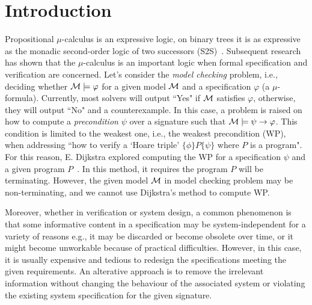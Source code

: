 \documentclass[runningheads]{llncs}
\begin{document}
\section{Introduction}
Propositional $\mu$-calculus is an expressive logic, on binary trees it is as expressive as the monadic second-order logic of two successors (S2S)~\cite{emerson1991tree,niwinski1988fixed}.
Subsequent research has shown that the $\mu$-calculus is an important logic when formal specification and verification are concerned.
Let's consider the \emph{model checking} problem, i.e., deciding whether ${\cal M} \models \varphi$ for a given model ${\cal M}$ and a specification $\varphi$ (a $\mu$-formula). Currently, most solvers will output ``Yes" if ${\cal M}$ satisfies $\varphi$, otherwise, they will output ``No" and a counterexample. In this case, a problem is raised on how to compute a \emph{precondition} $\psi$ over a signature such that ${\cal M} \models \psi \rightarrow \varphi$.
This condition is limited to the weakest one, i.e., the weakest precondition (WP), when addressing ``how to verify a `Hoare triple' $\{\phi\} P\{\psi\}$ where $P$ is a program".
For this reason, E. Dijkstra explored computing the WP for a specification $\psi$ and a given program $P$~\cite{DBLP:journals/cacm/Dijkstra75}.
In this method, it requires the program $P$ will be terminating. 
However, the given model ${\cal M}$ in model checking problem may be non-terminating, and we cannot use  Dijkstra's method to compute WP.


Moreover, whether in verification or system design, a common phenomenon is that some informative content in a specification may be system-independent for a variety of reasons e.g., it may be discarded or become obsolete over time, or it might become unworkable because of practical difficulties.
However, in this case, it is usually expensive and tedious to redesign the specifications meeting the given requirements. An alterative approach is to remove the irrelevant information without changing the behaviour of the associated system or violating the existing system specification for the given signature.
\end{document}
